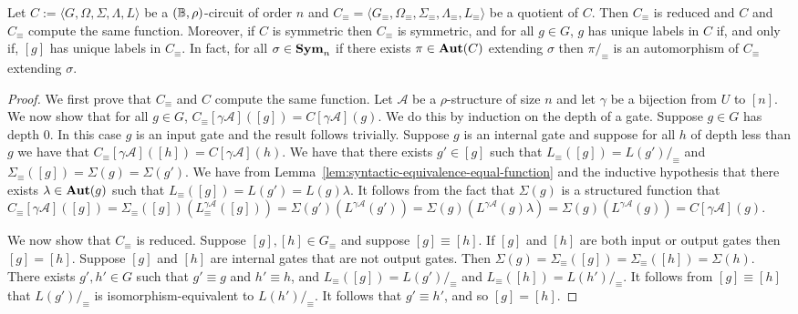 \documentclass[../paper.tex]{subfiles}
\begin{document}
\begin{lem}
  Let $C := \langle G, \Omega, \Sigma, \Lambda, L\rangle$ be a $(\mathbb{B},
  \rho)$-circuit of order $n$ and $C_{\equiv} = \langle G_\equiv ,
  \Omega_\equiv, \Sigma_\equiv , \Lambda_\equiv, L_\equiv \rangle$ be a quotient
  of $C$. Then $C_\equiv$ is reduced and $C$ and $C_{\equiv}$ compute the same
  function. Moreover, if $C$ is symmetric then $C_{\equiv}$ is symmetric, and
  for all $g \in G$, $g$ has unique labels in $C$ if, and only if, $[g]$ has
  unique labels in $C_{\equiv}$. In fact, for all $\sigma \in \text{\textbf{Sym}}_n$ if there
  exists $\pi \in \text{\textbf{Aut}}(C)$ extending $\sigma$ then $\pi /_\equiv$ is an
  automorphism of $C_\equiv$ extending $\sigma$.
  \label{lem:quotient-circuits-preserve}
\end{lem}
\begin{proof}
  We first prove that $C_\equiv$ and $C$ compute the same function. Let
  $\mathcal{A}$ be a $\rho$-structure of size $n$ and let $\gamma$ be a
  bijection from $U$ to $[n]$. We now show that for all $g \in G$, $C_\equiv
  [\gamma \mathcal{A}]([g]) = C[\gamma \mathcal{A}](g)$. We do this by induction
  on the depth of a gate. Suppose $g \in G$ has depth $0$. In this case $g$ is
  an input gate and the result follows trivially. Suppose $g$ is an internal
  gate and suppose for all $h$ of depth less than $g$ we have that
  $C_\equiv[\gamma \mathcal{A}]([h]) = C[\gamma \mathcal{A}](h)$. We have that
  there exists $g' \in [g]$ such that $L_\equiv ([g]) = L(g') /_\equiv$ and
  $\Sigma_\equiv([g]) = \Sigma (g) = \Sigma (g')$. We have from
  Lemma~\ref{lem:syntactic-equivalence-equal-function} and the inductive
  hypothesis that there exists $\lambda \in \text{\textbf{Aut}}(g)$ such that $L_\equiv ([g]) =
  L(g') = L(g) \lambda$. It follows from the fact that $\Sigma(g)$ is a
  structured function that $C_\equiv[\gamma \mathcal{A}]([g]) = \Sigma_\equiv
  ([g])(L^{\gamma \mathcal{A}}_\equiv([g])) = \Sigma (g') (L^{\gamma
    \mathcal{A}}(g')) = \Sigma (g)(L^{\gamma \mathcal{A}}(g) \lambda) = \Sigma
  (g) (L^{\gamma \mathcal{A}}(g)) = C[\gamma \mathcal{A}](g)$.
  
  We now show that $C_\equiv$ is reduced. Suppose $[g], [h] \in G_\equiv$ and
  suppose $[g] \equiv [h]$. If $[g]$ and $[h]$ are both input or output gates
  then $[g] = [h]$. Suppose $[g]$ and $[h]$ are internal gates that are not
  output gates. Then $\Sigma (g) = \Sigma_\equiv ([g]) = \Sigma_\equiv([h]) =
  \Sigma(h)$. There exists $g', h' \in G$ such that $g' \equiv g$ and $h' \equiv
  h$, and $L_\equiv ([g]) = L(g') /_\equiv$ and $L_\equiv ([h]) = L(h')
  /_\equiv$. It follows from $[g] \equiv [h]$ that $L(g') /_\equiv$ is
  isomorphism-equivalent to $L(h') /_\equiv$. It follows that $g' \equiv h'$,
  and so $[g] = [h]$.


\end{proof}
\end{document}
